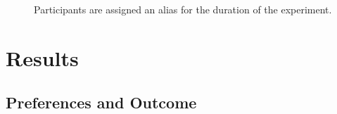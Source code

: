 \begin{figure}
\label{fig:alias}
\center
{}
\caption{Participants are assigned an alias for the duration of the experiment.}
\end{figure}


\section{Results}
\label{sec:res}

\subsection{Preferences and Outcome}
\label{sec:res-outcome}

